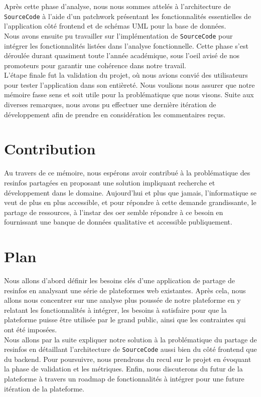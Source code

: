 Après cette phase d'analyse, nous nous sommes attelés à l'architecture de \texttt{SourceCode} à l'aide d'un patchwork présentant les fonctionnalités essentielles de l'application côté \gls{frontend} et de schémas UML pour la base de données.\\

Nous avons ensuite pu travailler sur l'implémentation de \texttt{SourceCode} pour intégrer les fonctionnalités listées dans l'analyse fonctionnelle. Cette phase s'est déroulée durant quasiment toute l'année académique, sous l'oeil avisé de nos promoteurs pour garantir une cohérence dans notre travail.\\

L'étape finale fut la validation du projet, où nous avions convié des utilisateurs pour tester l'application dans son entièreté. Nous voulions nous assurer que notre mémoire fasse sens et soit utile pour la problématique que nous visons. Suite aux diverses remarques, nous avons pu effectuer une dernière itération de développement afin de prendre en considération les commentaires reçus.

\section*{Contribution}

Au travers de ce mémoire, nous espérons avoir contribué à la problématique des \glspl{resinfo} partagées en proposant une solution impliquant recherche et développement dans le domaine. Aujourd’hui et plus que jamais, l'informatique se veut de plus en plus accessible, et pour répondre à cette demande grandissante, le partage de ressources, à l'instar des \gls{oer} semble répondre à ce besoin en fournissant une banque de données qualitative et accessible publiquement.

\section*{Plan}

Nous allons d'abord définir les besoins clés d'une application de partage de \glspl{resinfo} en analysant une série de plateformes web existantes.
Après cela, nous allons nous concentrer sur une analyse plus poussée de notre plateforme en y relatant les fonctionnalités à intégrer, les besoins à satisfaire pour que la plateforme puisse être utilisée par le grand public, ainsi que les contraintes qui ont été imposées.\\

Nous allons par la suite expliquer notre solution à la problématique du partage de \glspl{resinfo} en détaillant l'architecture de \texttt{SourceCode} aussi bien du côté \gls{frontend} que du \gls{backend}.
Pour poursuivre, nous prendrons du recul sur le projet en évoquant la phase de validation et les métriques. 
Enfin, nous discuterons du futur de la plateforme à travers un roadmap de fonctionnalités à intégrer pour une future itération de la plateforme.
